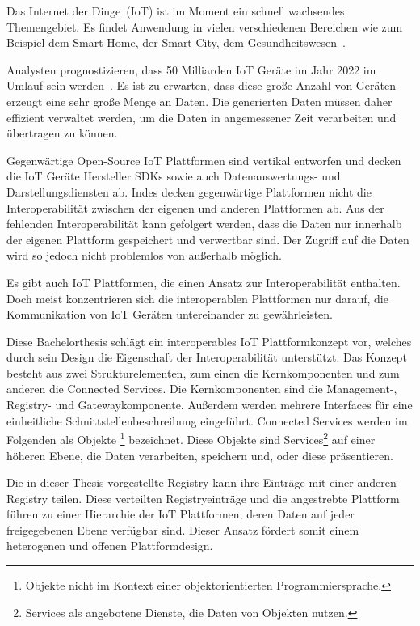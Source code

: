 Das Internet der Dinge~(IoT) ist im Moment ein schnell wachsendes Themengebiet.
Es findet Anwendung in vielen verschiedenen Bereichen wie zum Beispiel dem Smart Home, der Smart City, dem Gesundheitswesen~\cite{kaa}.

Analysten prognostizieren, dass 50 Milliarden IoT Geräte im Jahr 2022 im Umlauf sein werden~\cite{rise}. 
Es ist zu erwarten, dass diese große Anzahl von Geräten erzeugt eine sehr große Menge an Daten. 
Die generierten Daten müssen daher effizient verwaltet werden, um die Daten in angemessener Zeit verarbeiten und übertragen zu können. \newline

\noindent Gegenwärtige Open-Source IoT Plattformen sind vertikal entworfen und decken die IoT Geräte Hersteller SDKs sowie auch Datenauswertungs- und Darstellungsdiensten ab. 
Indes decken gegenwärtige Plattformen nicht die Interoperabilität zwischen der eigenen und anderen Plattformen ab. 
Aus der fehlenden Interoperabilität kann gefolgert werden, dass die Daten nur  innerhalb der eigenen Plattform gespeichert und verwertbar sind.
Der Zugriff auf die Daten wird so jedoch nicht problemlos von außerhalb möglich. 

Es gibt auch IoT Plattformen, die einen Ansatz zur Interoperabilität enthalten. 
Doch meist konzentrieren sich die interoperablen Plattformen nur darauf, die Kommunikation von IoT Geräten untereinander zu gewährleisten. \newline

\noindent Diese Bachelorthesis schlägt ein interoperables IoT Plattformkonzept vor, welches durch sein Design die Eigenschaft der Interoperabilität unterstützt. 
Das Konzept besteht aus zwei Strukturelementen, zum einen die Kernkomponenten und zum anderen die \glqq Connected Services\grqq{}. 
Die Kernkomponenten sind die Management-, Registry- und Gatewaykomponente. 
Außerdem werden mehrere Interfaces für eine einheitliche Schnittstellenbeschreibung eingeführt.
\glqq Connected Services\grqq{} werden im Folgenden als \glqq Objekte\grqq{} \footnote[1]{Objekte nicht im Kontext einer objektorientierten Programmiersprache.} bezeichnet. 
Diese Objekte sind \glqq Services\grqq{}\footnote[2]{Services als angebotene Dienste, die Daten von Objekten nutzen.} auf einer höheren Ebene, die Daten verarbeiten, speichern und, oder diese präsentieren. 

Die in dieser Thesis vorgestellte Registry kann ihre Einträge mit einer anderen Registry teilen. 
Diese verteilten Registryeinträge und die angestrebte Plattform führen zu einer Hierarchie der IoT Plattformen, deren Daten auf jeder freigegebenen Ebene verfügbar sind. 
Dieser Ansatz fördert somit einem heterogenen und offenen Plattformdesign.

